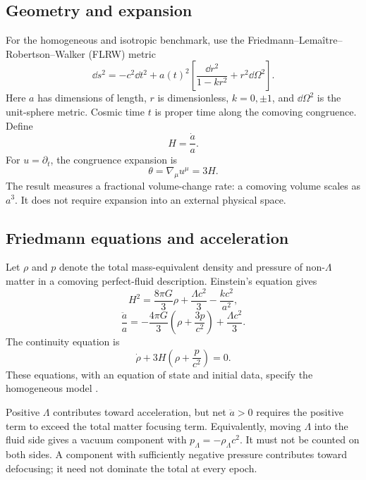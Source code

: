\documentclass[11pt]{article}
\begin{document}
\subsection{Geometry and expansion}
For the homogeneous and isotropic benchmark, use the Friedmann--Lema\^itre--Robertson--Walker (FLRW) metric
\begin{equation}
\dd s^2=-c^2\dd t^2+a(t)^2\left[
\frac{\dd r^2}{1-kr^2}+r^2\dd\Omega^2\right].
\label{eq:flrwmetric}
\end{equation}
Here $a$ has dimensions of length, $r$ is dimensionless, $k=0,\pm1$, and $\dd\Omega^2$ is the unit-sphere metric. Cosmic time $t$ is proper time along the comoving congruence. Define
\begin{equation}
H=\frac{\dot a}{a}.
\label{eq:hubble}
\end{equation}
For $u=\partial_t$, the congruence expansion is
\begin{equation}
\theta=\nabla_\mu u^\mu=3H.
\label{eq:theta3h}
\end{equation}
The result measures a fractional volume-change rate: a comoving volume scales as $a^3$. It does not require expansion into an external physical space.

\subsection{Friedmann equations and acceleration}
Let $\rho$ and $p$ denote the total mass-equivalent density and pressure of non-$\Lambda$ matter in a comoving perfect-fluid description. Einstein's equation gives
\begin{equation}
H^2=\frac{8\pi G}{3}\rho+\frac{\Lambda c^2}{3}-\frac{kc^2}{a^2},
\label{eq:friedmann1}
\end{equation}
\begin{equation}
\frac{\ddot a}{a}=-\frac{4\pi G}{3}\left(\rho+\frac{3p}{c^2}\right)
+\frac{\Lambda c^2}{3}.
\label{eq:friedmann2}
\end{equation}
The continuity equation is
\begin{equation}
\dot\rho+3H\left(\rho+\frac{p}{c^2}\right)=0.
\end{equation}
These equations, with an equation of state and initial data, specify the homogeneous model \parencite{EllisVanElst1999,Carroll1997}.

Positive $\Lambda$ contributes toward acceleration, but net $\ddot a>0$ requires the positive term to exceed the total matter focusing term. Equivalently, moving $\Lambda$ into the fluid side gives a vacuum component with $p_\Lambda=-\rho_\Lambda c^2$. It must not be counted on both sides. A component with sufficiently negative pressure contributes toward defocusing; it need not dominate the total at every epoch.
\end{document}
